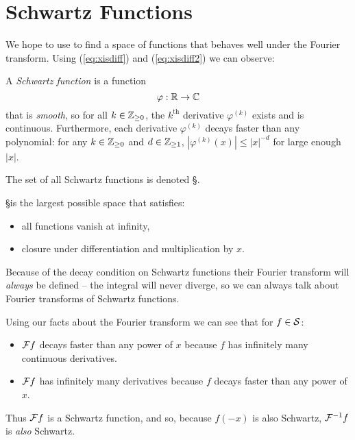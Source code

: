     \section{Schwartz Functions}
      We hope to use  to find a space of functions that behaves well under the Fourier transform.
      Using (\ref{eq:xisdiff}) and (\ref{eq:xisdiff2}) we can observe:
      \begin{defn}
        A \emph{Schwartz function} is a function
        \begin{equation*}
          \varphi:\R\rightarrow\C
        \end{equation*}
        that is \emph{smooth}, so for all $k\in\Z_{\ge0}$, the $k^\text{th}$ derivative $\varphi^{(k)}$ exists and is continuous.
        Furthermore, each derivative $\varphi^{(k)}$ decays faster than any polynomial: for any $k\in\Z_{\ge0}$ and $d\in\Z_{\ge1}$, $|\varphi^{(k)}(x)|\le|x|^{-d}$ for large enough $|x|$.

        The set of all Schwartz functions is denoted \S.

        \S is the largest possible space that satisfies:
        \begin{itemize}
          \item all functions vanish at infinity,
          \item closure under differentiation and multiplication by $x$.
        \end{itemize}
      \end{defn}
      Because of the decay condition on Schwartz functions their Fourier transform will \emph{always} be defined -- the integral will never diverge, so we can always talk about Fourier transforms of Schwartz functions.

      Using our facts about the Fourier transform we can see that for $f\in\S$:
      \begin{itemize}
        \item $\F f$ decays faster than any power of $x$ because $f$ has infinitely many continuous derivatives.
        \item $\F f$ has infinitely many derivatives because $f$ decays faster than any power of $x$.
      \end{itemize}
      Thus $\F f$ is a Schwartz function, and so, because $f(-x)$ is also Schwartz, $\F^{-1}f$ is \emph{also} Schwartz.

